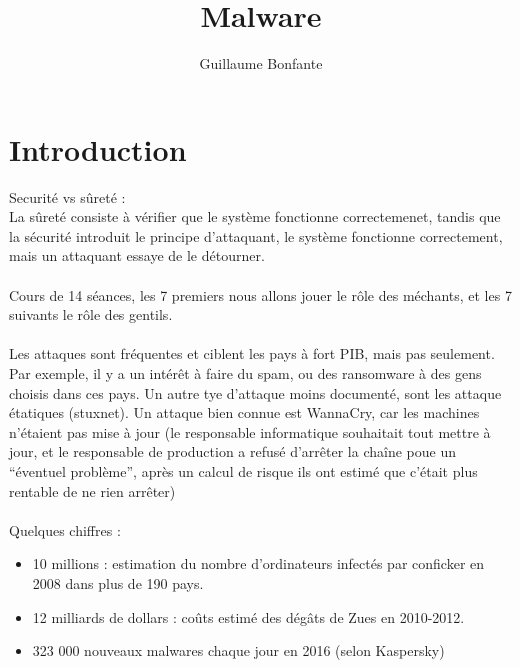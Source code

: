 \documentclass[a4paper,10pt]{article}
\title{Malware}
\author{Guillaume Bonfante}
\begin{document}
\maketitle

\section{Introduction}

Securité vs sûreté : \\

La sûreté consiste à vérifier que le système fonctionne correctemenet, tandis que la sécurité introduit le principe d'attaquant, le système fonctionne correctement, mais un attaquant essaye de le détourner.

\paragraph*{}
Cours de 14 séances, les 7 premiers nous allons jouer le rôle des méchants, et les 7 suivants le rôle des gentils.

\paragraph*{}
Les attaques sont fréquentes et ciblent les pays à fort PIB, mais pas seulement. Par exemple, il y a un intérêt à faire du spam, ou des ransomware à des gens choisis dans ces pays. Un autre tye d'attaque moins documenté, sont les attaque étatiques (stuxnet). Un attaque bien connue est WannaCry, car les machines n'étaient pas mise à jour (le responsable informatique souhaitait tout mettre à jour, et le responsable de production a refusé d'arrêter la chaîne poue un ``éventuel problème'', après un calcul de risque ils ont estimé que c'était plus rentable de ne rien arrêter)

\paragraph*{}
Quelques chiffres :
\begin{itemize}
 \item 10 millions : estimation du nombre d'ordinateurs infectés par conficker en 2008 dans plus de 190 pays.
 \item 12 milliards de dollars : coûts estimé des dégâts de Zues en 2010-2012.
 \item 323 000 nouveaux malwares chaque jour en 2016 (selon Kaspersky)
\end{itemize}
\end{document}
